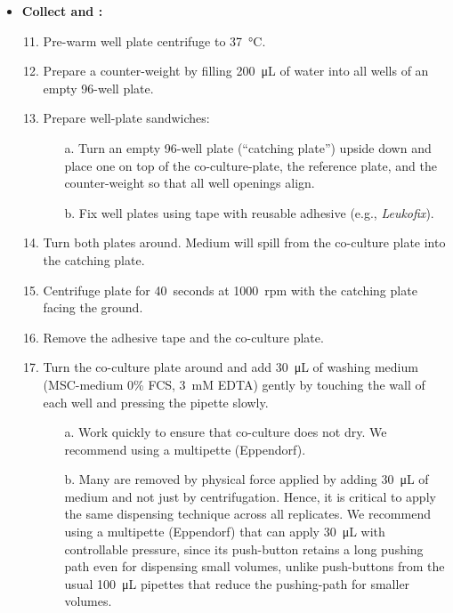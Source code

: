 \begin{itemize}
    \item \textbf{Collect \CMina and \nMAina:}
          \begin{enumerate}
              \setcounter{enumi}{10}
              \item Pre-warm well plate centrifuge to \SI{37}{\degreeCelsius}.
              \item Prepare a counter-weight by filling \SI{200}{\micro\liter} of water into all wells of an empty 96-well plate.
              \item Prepare well-plate sandwiches:
                    \begin{itemize}
                        \item[a.] Turn an empty 96-well plate (“catching plate”) upside down and place one on top of the co-culture-plate, the \CMina reference plate, and the counter-weight so that all well openings align.
                        \item[b.] Fix well plates using tape with reusable adhesive (e.g., \textit{Leukofix}).
                    \end{itemize}
              \item Turn both plates around. Medium will spill from the co-culture plate into the catching plate.
              \item Centrifuge plate for \SI{40}{seconds} at \SI{1000}{rpm} with the catching plate facing the ground.
              \item Remove the adhesive tape and the co-culture plate.
              \item Turn the co-culture plate around and add \SI{30}{\micro\liter} of washing medium (MSC-medium 0\% FCS, \SI{3}{mM} EDTA) gently by touching the wall of each well and pressing the pipette slowly.
                    \begin{itemize}
                        \item[a.] Work quickly to ensure that co-culture does not dry. We recommend using a multipette (Eppendorf).
                        \item[b.] Many \nMAina are removed by physical force applied by adding \SI{30}{\micro\liter} of medium and not just by centrifugation. Hence, it is critical to apply the same dispensing technique across all replicates. We recommend using a multipette (Eppendorf) that can apply \SI{30}{\micro\liter} with controllable pressure, since its push-button retains a long pushing path even for dispensing small volumes, unlike push-buttons from the usual \SI{100}{\micro\liter} pipettes that reduce the pushing-path for smaller volumes.

\end{itemize}
\end{enumerate}
\end{itemize}
